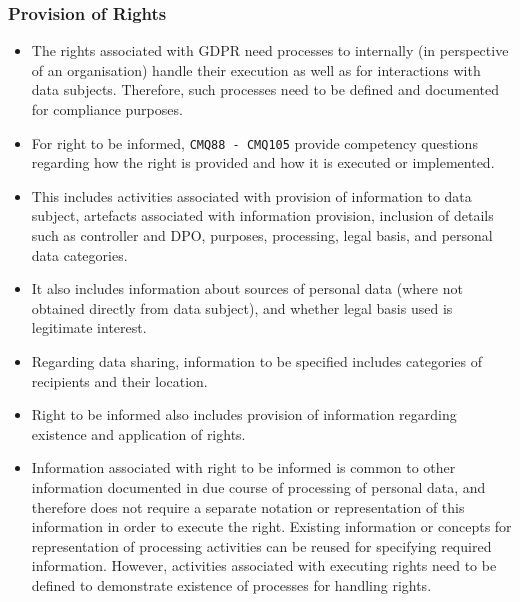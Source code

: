 \subsubsection{Provision of Rights}
\begin{itemize}
    \item The rights associated with GDPR need processes to internally (in perspective of an organisation) handle their execution as well as for interactions with data subjects. Therefore, such processes need to be defined and documented for compliance purposes.
    \item For right to be informed, \texttt{CMQ88 - CMQ105} provide  competency questions regarding how the right is provided and how it is executed or implemented.
    \item This includes activities associated with provision of information to data subject, artefacts associated with information provision, inclusion of details such as controller and DPO, purposes, processing, legal basis, and personal data categories.
    \item It also includes information about sources of personal data (where not obtained directly from data subject), and whether legal basis used is legitimate interest.
    \item Regarding data sharing, information to be specified includes categories of recipients and their location.
    \item Right to be informed also includes provision of information regarding existence and application of rights.
    \item Information associated with right to be informed is common to other information documented in due course of processing of personal data, and therefore does not require a separate notation or representation of this information in order to execute the right. Existing information or concepts for representation of processing activities can be reused for specifying required information. However, activities associated with executing rights need to be defined to demonstrate existence of processes for handling rights.
\end{itemize}

